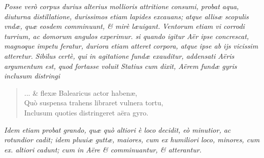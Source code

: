 \documentclass[11pt,twoside,openany]{book}
\begin{document}
\textit{Posse verò corpus durius alterius mollioris attritione consumi, probat aqua, diuturna distillatione, durissimos etiam lapides excauans; atque allisæ scopulis vndæ, quæ eosdem comminuunt, \& mirè læuigant. }\textit{Ventorum etiam vi corrodi turrium, ac domorum angulos experimur. si quando igitur Aër ipse concrescat, magnoque impetu feratur, duriora etiam atteret corpora, atque ipse ab ijs vicissim atteretur. }\textit{Sibilus certè, qui in agitatione fundæ exauditur, addensati Aëris argumentum est, quod fortasse voluit Statius }\textit{cum dixit, Aërem fundæ gyris inclusum distringi}


\begin{verse}

... \& flexæ Balearicus actor habenæ, \\

Quò suspensa trahens libraret vulnera tortu, \\

Inclusum quoties distringeret aëra gyro. \\

\end{verse}

\textit{Idem etiam probat grando, quæ quò altiori è loco decidit, eò minutior, ac rotundior cadit; idem pluuiæ guttæ, maiores, cum ex humiliori loco, minores, cum ex. altiori cadunt; cum in Aëre \& comminuantur, \& atterantur.}
\end{document}
